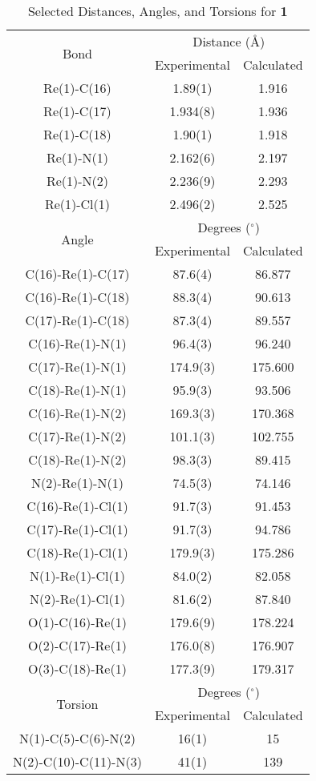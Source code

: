 \begin{table}[htbp]
  \caption{Selected Distances, Angles, and Torsions for \textbf{1}}
  \centering
    \begin{tabular}{ccc}
    \toprule
    \multirow{2}{*}{Bond} & \multicolumn{2}{c}{Distance (\r{A})} \\ \cline{2-3}
     & Experimental & Calculated \\ \midrule
    Re(1)-C(16) & 1.89(1) & 1.916 \\
    Re(1)-C(17) & 1.934(8) & 1.936 \\
    Re(1)-C(18) & 1.90(1) & 1.918 \\
    Re(1)-N(1) & 2.162(6) & 2.197 \\
    Re(1)-N(2) & 2.236(9) & 2.293 \\
    Re(1)-Cl(1) & 2.496(2) & 2.525 \\ \midrule
    \multirow{2}{*}{Angle} & \multicolumn{2}{c}{Degrees ($^\circ$)} \\ \cline{2-3}
     & Experimental & Calculated \\ \midrule
    C(16)-Re(1)-C(17) & 87.6(4) & 86.877 \\
    C(16)-Re(1)-C(18) & 88.3(4) & 90.613 \\
    C(17)-Re(1)-C(18) & 87.3(4) & 89.557 \\
    C(16)-Re(1)-N(1) & 96.4(3) & 96.240 \\
    C(17)-Re(1)-N(1) & 174.9(3) & 175.600 \\
    C(18)-Re(1)-N(1) & 95.9(3) & 93.506 \\
    C(16)-Re(1)-N(2) & 169.3(3) & 170.368 \\
    C(17)-Re(1)-N(2) & 101.1(3) & 102.755 \\
    C(18)-Re(1)-N(2) & 98.3(3) & 89.415 \\
    N(2)-Re(1)-N(1) & 74.5(3) & 74.146 \\
    C(16)-Re(1)-Cl(1) & 91.7(3) & 91.453 \\
    C(17)-Re(1)-Cl(1) & 91.7(3) & 94.786 \\
    C(18)-Re(1)-Cl(1) & 179.9(3) & 175.286 \\
    N(1)-Re(1)-Cl(1) & 84.0(2) & 82.058 \\
    N(2)-Re(1)-Cl(1) & 81.6(2) & 87.840 \\
    O(1)-C(16)-Re(1) & 179.6(9) & 178.224 \\
    O(2)-C(17)-Re(1) & 176.0(8) & 176.907 \\ 
    O(3)-C(18)-Re(1) & 177.3(9) & 179.317 \\ \midrule
    \multirow{2}{*}{Torsion} & \multicolumn{2}{c}{Degrees ($^\circ$)} \\ \cline{2-3}
     & Experimental & Calculated \\ \midrule
    N(1)-C(5)-C(6)-N(2) &  16(1) & 15\\
    N(2)-C(10)-C(11)-N(3) & 41(1) & 139\\
    \bottomrule
    \end{tabular}%
  \label{tab.da1}%
\end{table}%


